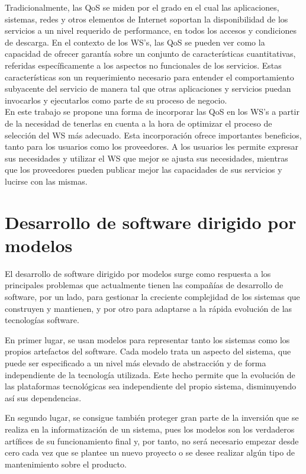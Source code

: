 Tradicionalmente, las QoS se miden por el grado en el cual las aplicaciones, sistemas, redes y otros elementos de Internet soportan la disponibilidad de los servicios a un nivel requerido de performance, en todos los accesos y condiciones de descarga. En el contexto de los WS's, las QoS se pueden ver como la capacidad de ofrecer garantía sobre un conjunto de características cuantitativas, referidas específicamente a los aspectos no funcionales de los servicios. Estas características son un requerimiento necesario para entender el comportamiento subyacente del servicio de manera tal que otras aplicaciones y servicios puedan invocarlos y ejecutarlos como parte de su proceso de negocio.\\

En este trabajo se propone una forma de incorporar las QoS en los WS's a partir de la necesidad de tenerlas en cuenta a la hora de optimizar el proceso de selección del WS más adecuado. Esta incorporación ofrece importantes beneficios, tanto para los usuarios como los proveedores. A los usuarios les permite expresar sus necesidades y utilizar el WS que mejor se ajusta sus necesidades, mientras que los proveedores pueden publicar mejor las capacidades de sus servicios y lucirse con las mismas.

\section{Desarrollo de software dirigido por modelos}
\label{Desarrollo de software dirigido por modelos}

El desarrollo de software dirigido por modelos surge como respuesta a los principales problemas que actualmente tienen las compañías de desarrollo de software, por un lado, para gestionar la creciente complejidad de los sistemas que construyen y mantienen, y por otro para adaptarse a la rápida evolución de las tecnologías software.

En primer lugar, se usan modelos para representar tanto los sistemas como los propios artefactos del software. Cada modelo trata un aspecto del sistema, que puede ser especificado a un nivel más elevado de abstracción y de forma independiente de la tecnología utilizada. Este hecho permite que la evolución de las plataformas tecnológicas sea independiente del propio sistema, disminuyendo así sus dependencias.

En segundo lugar, se consigue también proteger gran parte de la inversión que se realiza en la informatización de un sistema, pues los modelos son los verdaderos artífices de su funcionamiento final y, por tanto, no será necesario empezar desde cero cada vez que se plantee un nuevo proyecto o se desee realizar algún tipo de mantenimiento sobre el producto.

